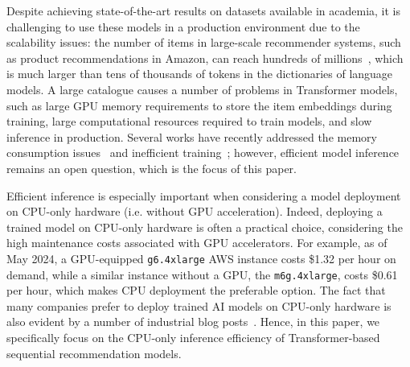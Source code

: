 \documentclass[sigconf,natbib=true, review=true]{acmart} %
\newcommand{\rsasha}[1]{\textcolor[HTML]{FF0000}{#1}}
\begin{document}
 Despite achieving state-of-the-art results on \rsasha{datasets available in academia}, it is challenging to use these models in a production environment due to the scalability issues: the number of items in large-scale recommender systems, such as product recommendations in Amazon, can reach hundreds of millions~\cite{AmazonStatisticsUptoDate}, which is much larger than tens of thousands of tokens in the dictionaries of language models. A large catalogue causes a number of problems in Transformer models, such as large GPU memory requirements to store the item embeddings \rsasha{during training}, large computational resources required to train models, and slow inference in production. Several works have recently addressed the memory consumption issues~\cite{xiaEfficientOnDeviceSessionBased2023, petrovRecJPQTrainingLargeCatalogue2024} and inefficient training~\cite{klenitskiyTurningDrossGold2023, petrovGSASRecReducingOverconfidence2023, petrovRSSEffectiveEfficient2023}; however, efficient model inference remains an open question, which is the focus of this paper.

\rsasha{Efficient inference is especially important when considering a model deployment on CPU-only hardware (i.e. without GPU acceleration). Indeed, deploying a trained model on CPU-only hardware is often a practical choice, considering the high maintenance costs associated with GPU accelerators. For example, as of May 2024, a GPU-equipped \texttt{g6.4xlarge} AWS instance costs \$1.32 per hour on demand, while a similar instance without a GPU, the \texttt{m6g.4xlarge}, costs \$0.61 per hour, which makes CPU deployment the preferable option. The fact that many companies prefer to deploy trained AI models on CPU-only hardware is also evident by a number of industrial blog posts~\cite{gowdaDemocratizingGenerativeAI2024, abidiAIInferenceAcceleration2022, martinWhyCPUsAlso2023}. Hence, in this paper, we specifically focus on the CPU-only inference efficiency of Transformer-based sequential recommendation models.}
\end{document}
